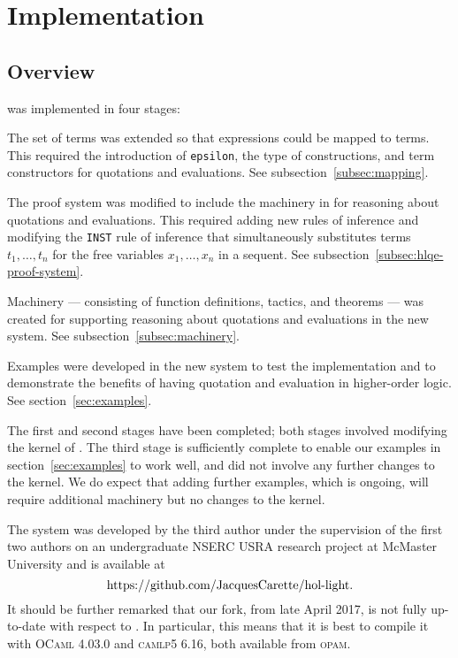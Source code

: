 \documentclass[fleqn]{llncs}
\begin{document}
\section{Implementation}\label{sec:implementation}

\subsection{Overview}

{\HLQE} was implemented in four stages:

\be

  \item The set of terms was extended so that {\churchqe}
    expressions could be mapped to {\HL} terms.  This required the
    introduction of \texttt{epsilon}, the type of constructions, and
    term constructors for quotations and evaluations.  See
    subsection~\ref{subsec:mapping}.

  \item The proof system was modified to include the machinery
    in {\churchqe} for reasoning about quotations and evaluations.
    This required adding new rules of inference and modifying
    the \texttt{INST} rule of inference that simultaneously
    substitutes terms $t_1,\ldots,t_n$ for the free variables
    $x_1,\ldots,x_n$ in a sequent.  See
    subsection~\ref{subsec:hlqe-proof-system}.

  \item Machinery --- consisting of {\HOL} function definitions,
    tactics, and theorems --- was created for supporting reasoning
    about quotations and evaluations in the new system.  See
    subsection~\ref{subsec:machinery}.

  \item Examples were developed in the new system to test the
    implementation and to demonstrate the benefits of having quotation
    and evaluation in higher-order logic.  See section~\ref{sec:examples}.

\ee

\noindent
The first and second stages have been completed; both stages involved
modifying the kernel of {\HL}.  The third stage is sufficiently
complete to enable our examples in section~\ref{sec:examples} to work
well, and did not involve any further changes to the {\HL} kernel.  We
do expect that adding further examples, which is ongoing, will require
additional machinery but no changes to the kernel.

The {\HLQE} system was developed by the third author under the
supervision of the first two authors on an undergraduate NSERC USRA
research project at McMaster University and is available at
\[\mbox{https://github.com/JacquesCarette/hol-light}.\]
It should be further remarked that our fork, from late April 2017, is not fully
up-to-date with respect to {\HL}. In particular, this means that it is best to
compile it with \textsc{OCaml 4.03.0} and \textsc{camlp5 6.16},
both available from \textsc{opam}.
\end{document}
